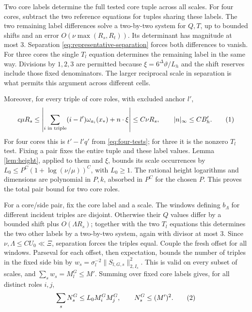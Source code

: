 \documentclass[11pt]{article}
\theoremstyle{definition}
\newcommand{\eqtag}[1]{\refstepcounter{equation}\tag{\theequation}\label{#1}}
\numberwithin{equation}{section}
\begin{document}
Two core labels determine the full tested core tuple across all scales. For four cores, subtract the two reference equations for tuples sharing these labels. The two remaining label differences solve a two-by-two system for $Q,T$, up to bounded shifts and an error $O(\nu\max(R_s,R_t))$. Its determinant has magnitude at most $3$. Separation \eqref{eq:representative-separation} forces both differences to vanish. For three cores the single $T_l$ equation determines the remaining label in the same way. Divisions by $1,2,3$ are permitted because $\xi=6^\Delta\vartheta/L_h$ and the shift reserves include those fixed denominators. The larger reciprocal scale in separation is what permits this argument across different cells.

Moreover, for every triple of core roles, with excluded anchor $l'$,
\[
 c\mu R_s\le\left|\sum_{i\text{ in triple}}(i-l')\omega_{a_i}(x_*)+n\cdot\xi\right|
 \le C\nu R_s,\qquad |n|_\infty\le CB_h'.
 \eqtag{eq:triple-test}
\]
For four cores this is $t'-l'q'$ from \eqref{eq:four-tests}; for three it is the nonzero $T_l$ test. Fixing a pair fixes the entire tuple and these label values. Lemma \ref{lem:height}, applied to them and $\xi$, bounds its scale occurrences by $L_0\le P^C(1+\log(\nu/\mu))^C$, with $L_0\ge1$. The rational height logarithms and dimensions are polynomial in $P,k$, absorbed in $P^C$ for the chosen $P$. This proves the total pair bound for two core roles.

For a core/side pair, fix the core label and a scale. The windows defining $b_\Lambda$ for different incident triples are disjoint. Otherwise their $Q$ values differ by a bounded shift plus $O(\Lambda R_s)$; together with the two $T_l$ equations this determines the two other labels by a two-by-two system, again with divisor at most $3$. Since $\nu,\Lambda\le CU_0\ll\Xi$, separation forces the triples equal. Couple the fresh offset for all windows. Parseval for each offset, then expectation, bounds the number of triples in the fixed side bin by $w_s=\sigma_l^{-2}\|S_{l,G,s}\|_{2,I_s}^2$. This is valid on every subset of scales, and $\sum_sw_s=M_l^G\le M'$. Summing over fixed core labels gives, for all distinct roles $i,j$,
\[
 \sum_sN_s^G\le L_0 M_i^G M_j^G,\qquad N_s^G\le(M')^2.
 \eqtag{eq:total-count}
\]
\end{document}
